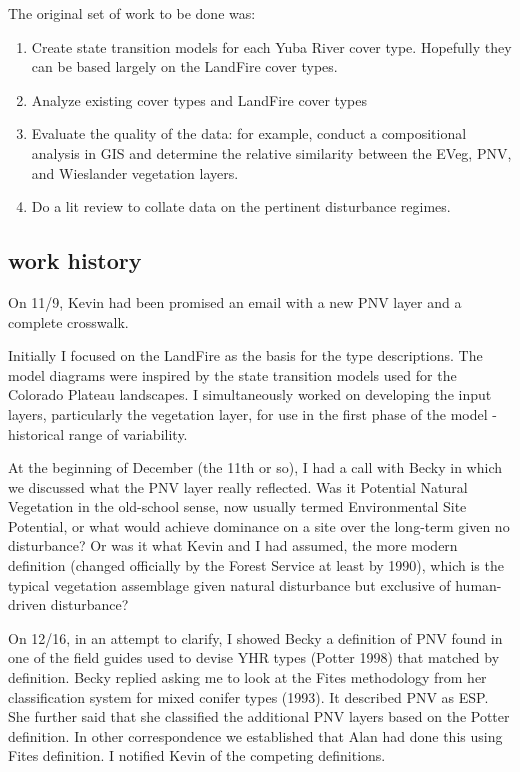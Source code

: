 \documentclass{book}
\begin{document}
The original set of work to be done was:
\begin{enumerate}
\item{Create state transition models for each Yuba River cover type. Hopefully they can be based largely on the LandFire cover types.}
\item{Analyze existing cover types and LandFire cover types}
\item{Evaluate the quality of the data: for example, conduct a compositional analysis in GIS and determine the relative similarity between the EVeg, PNV, and Wieslander vegetation layers.}
\item{Do a lit review to collate data on the pertinent disturbance regimes.}
\end{enumerate}

\subsection{work history}
On 11/9, Kevin had been promised an email with a new PNV layer and a complete crosswalk.

Initially I focused on the LandFire as the basis for the type descriptions. The model diagrams were inspired by the state transition models used for the Colorado Plateau landscapes. I simultaneously worked on developing the input layers, particularly the vegetation layer, for use in the first phase of the model - historical range of variability.

At the beginning of December (the 11th or so), I had a call with Becky in which we discussed what the PNV layer really reflected. Was it Potential Natural Vegetation in the old-school sense, now usually termed Environmental Site Potential, or what would achieve dominance on a site over the long-term given no disturbance? Or was it what Kevin and I had assumed, the more modern definition (changed officially by the Forest Service at least by 1990), which is the typical vegetation assemblage given natural disturbance but exclusive of human-driven disturbance?

On 12/16, in an attempt to clarify, I showed Becky a definition of PNV found in one of the field guides used to devise YHR types (Potter 1998) that matched by definition. Becky replied asking me to look at the Fites methodology from her classification system for mixed conifer types (1993). It described PNV as ESP. She further said that she classified the additional PNV layers based on the Potter definition. In other correspondence we established that Alan had done this using Fites definition. I notified Kevin of the competing definitions. 
\end{document}
